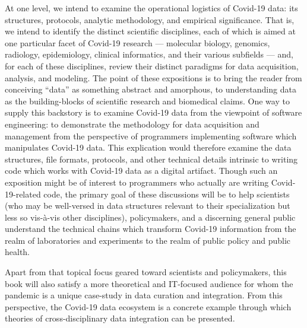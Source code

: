 \documentclass{statsoc}
\newcommand{\p}[1]{

\vspace{.75em}#1}
\newcommand{\textscc}[1]{{\color{orr!35!black}{{%
						\fontfamily{Cabin-TLF}\fontseries{b}\selectfont{\textsc{\scriptsize{#1}}}}}}}
\newcommand{\AcronymText}[1]{{\textscc{#1}}}
\newcommand{\q}[1]{{\fontfamily{qcr}\selectfont ``}#1{\fontfamily{qcr}\selectfont ''}}
\newcommand{\API}{\resizebox{!}{7pt}{\AcronymText{API}}}
\newcommand{\visavis}{vis-\`a-vis}
\begin{document}
{%
\p{At one level, we intend to examine the 
operational logistics of Covid-19 data: its 
structures, protocols, analytic methodology, 
and empirical significance.  That is, we 
intend to identify the distinct scientific 
disciplines, each of which is aimed at one 
particular facet of Covid-19 research --- molecular 
biology, genomics, radiology, epidemiology, clinical 
informatics, and their various subfields 
--- and, for each of these disciplines, 
review their distinct paradigms for 
data acquisition, analysis, and modeling.  
The point of these expositions is to bring 
the reader from conceiving \q{data} as something 
abstract and amorphous, to understanding 
data as the building-blocks of scientific 
research and biomedical claims.  One way to supply this backstory 
is to examine Covid-19 data from the viewpoint 
of software engineering: to demonstrate 
the methodology for data acquisition and 
management from the perspective of programmers 
implementing software which manipulates Covid-19 data.  
This explication would therefore examine the 
data structures, file formats, \API{} protocols, 
and other technical details intrinsic to writing 
code which works with Covid-19 data as a 
digital artifact.  Though such an exposition might be 
of interest to programmers who actually are 
writing Covid-19-related code, the primary 
goal of these discussions will be to help 
scientists (who may be well-versed in data 
structures relevant to their specialization 
but less so \visavis{} other disciplines), 
policymakers, and a discerning general public understand 
the technical chains which transform 
Covid-19 information from the realm of 
laboratories and experiments to the realm of 
public policy and public health.}


\p{Apart from that topical focus geared toward scientists and 
policymakers, this book will also satisfy a 
more theoretical and IT-focused audience for whom the 
pandemic is a unique case-study in data 
curation and integration.  From this perspective, 
the Covid-19 data ecosystem is a concrete example 
through which theories of cross-disciplinary data integration 
can be presented.}


}
\end{document}
